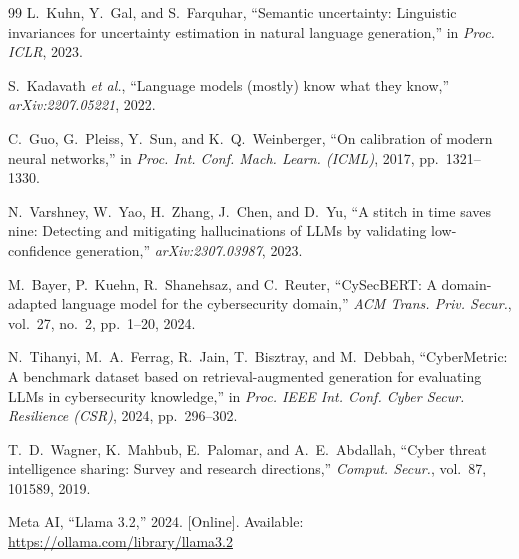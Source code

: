 \documentclass[conference]{IEEEtran}
\begin{document}
\begin{thebibliography}{99}
 L.~Kuhn, Y.~Gal, and S.~Farquhar, ``Semantic
uncertainty: Linguistic invariances for uncertainty estimation in natural
language generation,'' in \textit{Proc. ICLR}, 2023.

 S.~Kadavath \textit{et al.}, ``Language models
(mostly) know what they know,'' \textit{arXiv:2207.05221}, 2022.

 C.~Guo, G.~Pleiss, Y.~Sun, and
K.~Q.~Weinberger, ``On calibration of modern neural networks,'' in
\textit{Proc. Int. Conf. Mach. Learn. (ICML)}, 2017, pp.~1321--1330.

 N.~Varshney, W.~Yao, H.~Zhang, J.~Chen, and
D.~Yu, ``A stitch in time saves nine: Detecting and mitigating
hallucinations of LLMs by validating low-confidence generation,''
\textit{arXiv:2307.03987}, 2023.

 M.~Bayer, P.~Kuehn, R.~Shanehsaz, and C.~Reuter,
``CySecBERT: A domain-adapted language model for the cybersecurity
domain,'' \textit{ACM Trans. Priv. Secur.}, vol.~27, no.~2, pp.~1--20,
2024.

 N.~Tihanyi, M.~A.~Ferrag, R.~Jain,
T.~Bisztray, and M.~Debbah, ``CyberMetric: A benchmark dataset based on
retrieval-augmented generation for evaluating LLMs in cybersecurity
knowledge,'' in \textit{Proc. IEEE Int. Conf. Cyber Secur. Resilience
(CSR)}, 2024, pp.~296--302.

 T.~D.~Wagner, K.~Mahbub, E.~Palomar, and
A.~E.~Abdallah, ``Cyber threat intelligence sharing: Survey and research
directions,'' \textit{Comput. Secur.}, vol.~87, 101589, 2019.

 Meta AI, ``Llama 3.2,'' 2024. [Online]. Available:
\url{https://ollama.com/library/llama3.2}
\end{thebibliography}
\end{document}
